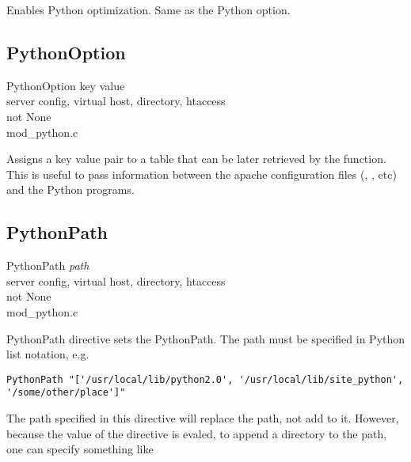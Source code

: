 Enables Python optimization. Same as the Python  option.

\subsection{PythonOption\label{dir-other-po}}

PythonOption key value \\
server config, virtual host, directory, htaccess\\
not None\\
mod_python.c

Assigns a key value pair to a table that can be later retrieved by the
 function. This is useful to pass information
between the apache configuration files (,
, etc) and the Python programs.

\subsection{PythonPath\label{dir-other-pp}}

PythonPath \emph{path} \\
server config, virtual host, directory, htaccess\\
not None\\
mod_python.c

PythonPath directive sets the PythonPath. The path must be specified
in Python list notation, e.g.

\begin{verbatim}
PythonPath "['/usr/local/lib/python2.0', '/usr/local/lib/site_python', '/some/other/place']"
\end{verbatim}

The path specified in this directive will replace the path, not add to
it. However, because the value of the directive is evaled, to append a
directory to the path, one can specify something like

